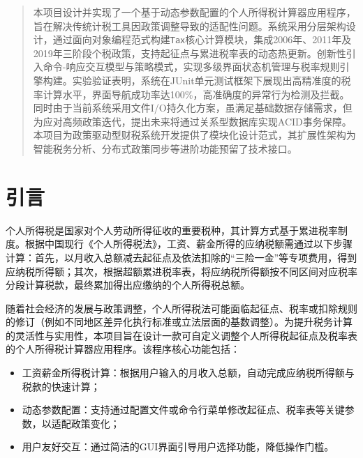 \documentclass[a4paper, utf8]{ctexart}
\begin{document}
    \let\cleardoublepage\clearpage

    \maketitle

    \renewcommand{\abstractname}{\large \textbf{摘要}}
    \begin{abstract}
        本项目设计并实现了一个基于动态参数配置的个人所得税计算器应用程序，旨在解决传统计税工具因政策调整导致的适配性问题。系统采用分层架构设计，通过面向对象编程范式构建\verb|Tax|核心计算模块，集成2006年、2011年及2019年三阶段个税政策，支持起征点与累进税率表的动态热更新。创新性引入命令-响应交互模型与策略模式，实现多级界面状态机管理与税率规则引擎构建。实验验证表明，系统在JUnit单元测试框架下展现出高精准度的税率计算水平，界面导航成功率达100\%，高准确度的异常行为检测及拦截。同时由于当前系统采用文件I/O持久化方案，虽满足基础数据存储需求，但为应对高频政策迭代，提出未来将通过关系型数据库实现ACID事务保障。本项目为政策驱动型财税系统开发提供了模块化设计范式，其扩展性架构为智能税务分析、分布式政策同步等进阶功能预留了技术接口。
	
    \end{abstract}

    \section{引言}

    个人所得税是国家对个人劳动所得征收的重要税种，其计算方式基于累进税率制度。根据中国现行《个人所得税法》，工资、薪金所得的应纳税额需通过以下步骤计算：首先，以月收入总额减去起征点及依法扣除的“三险一金”等专项费用，得到应纳税所得额；其次，根据超额累进税率表，将应纳税所得额按不同区间对应税率分段计算税款，最终累加得出应缴纳的个人所得税总额。

    随着社会经济的发展与政策调整，个人所得税法可能面临起征点、税率或扣除规则的修订（例如不同地区差异化执行标准或立法层面的基数调整）。为提升税务计算的灵活性与实用性，本项目旨在设计一款可自定义调整个人所得税起征点及税率表的个人所得税计算器应用程序。该程序核心功能包括：

    \begin{itemize}[itemsep=2pt, topsep=0pt, parsep=0pt]
        \item 工资薪金所得税计算：根据用户输入的月收入总额，自动完成应纳税所得额与税款的快速计算；
        \item 动态参数配置：支持通过配置文件或命令行菜单修改起征点、税率表等关键参数，以适配政策变化；
        \item 用户友好交互：通过简洁的GUI界面引导用户选择功能，降低操作门槛。
    \end{itemize}
\end{document}
